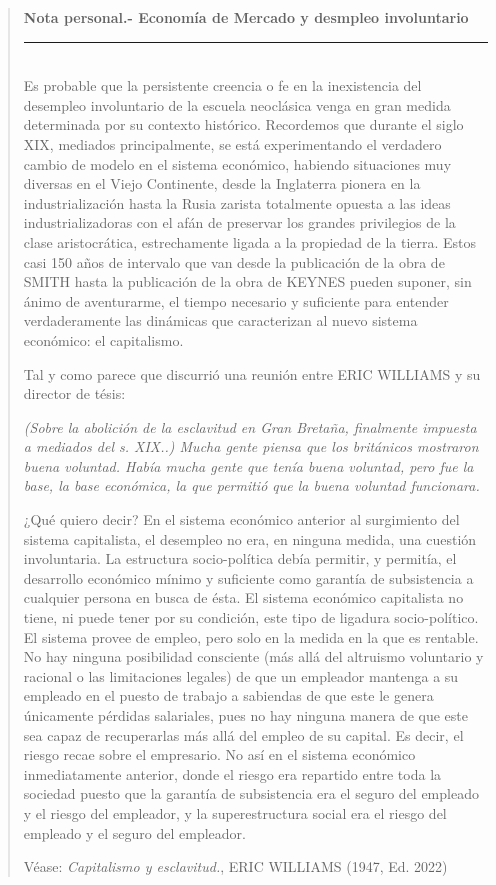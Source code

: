 \documentclass[10pt,a4paper]{article}
\newenvironment{specialblock}[1]{%
      \begin{quote} %
      \small %
      \noindent\textbf{#1}\\[-0.3em] %
      \rule{\linewidth}{0.4pt}\\[0.6em]}{
      \end{quote}}
\begin{document}
\begin{specialblock}{Nota personal.- Economía de Mercado y desmpleo involuntario}
    Es probable que la persistente creencia o fe en la inexistencia del desempleo involuntario de la escuela neoclásica venga en gran medida determinada por su contexto histórico. Recordemos que durante el siglo XIX, mediados principalmente, se está experimentando el verdadero cambio de modelo en el sistema económico, habiendo situaciones muy diversas en el Viejo Continente, desde la Inglaterra pionera en la industrialización hasta la Rusia zarista totalmente opuesta a las ideas industrializadoras con el afán de preservar los grandes privilegios de la clase aristocrática, estrechamente ligada a la propiedad de la tierra. Estos casi 150 años de intervalo que van desde la publicación de la obra de SMITH hasta la publicación de la obra de KEYNES pueden suponer, sin ánimo de aventurarme, el tiempo necesario y suficiente para entender verdaderamente las dinámicas que caracterizan al nuevo sistema económico: el capitalismo.
    
    Tal y como parece que discurrió una reunión entre ERIC WILLIAMS y su director de tésis: 
    
    \textit{(Sobre la abolición de la esclavitud en Gran Bretaña, finalmente impuesta a mediados del s. XIX..) Mucha gente piensa que los británicos mostraron buena voluntad. Había mucha gente que tenía buena voluntad, pero fue la base, la base económica, la que permitió que la buena voluntad funcionara.}
    
    ¿Qué quiero decir? En el sistema económico anterior al surgimiento del sistema capitalista, el desempleo no era, en ninguna medida, una cuestión involuntaria. La estructura socio-política debía permitir, y permitía, el desarrollo económico mínimo y suficiente como garantía de subsistencia a cualquier persona en busca de ésta. El sistema económico capitalista no tiene, ni puede tener por su condición, este tipo de ligadura socio-político. El sistema provee de empleo, pero solo en la medida en la que es rentable. No hay ninguna posibilidad consciente (más allá del altruismo voluntario y racional o las limitaciones legales) de que un empleador mantenga a su empleado en el puesto de trabajo a sabiendas de que este le genera únicamente pérdidas salariales, pues no hay ninguna manera de que este sea capaz de recuperarlas más allá del empleo de su capital. Es decir, el riesgo recae sobre el empresario. No así en el sistema económico inmediatamente anterior, donde el riesgo era repartido entre toda la sociedad puesto que la garantía de subsistencia era el seguro del empleado y el riesgo del empleador, y la superestructura social era el riesgo del empleado y el seguro del empleador.
    
    Véase: \textit{Capitalismo y esclavitud.}, ERIC WILLIAMS (1947, Ed. 2022)
    
\end{specialblock}
\end{document}
